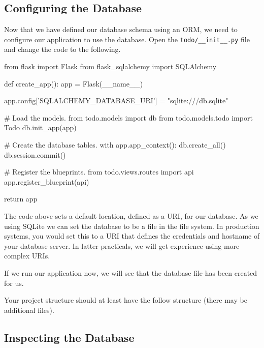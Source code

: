 \documentclass{csse4400}
\begin{document}
\subsection{Configuring the Database}

Now that we have defined our database schema using an ORM,
we need to configure our application to use the database.
Open the \texttt{todo/\_\_init\_\_.py} file and change the code to the following.

\begin{code}[language=python,numbers=none]{}
from flask import Flask
from flask_sqlalchemy import SQLAlchemy

def create_app():
    app = Flask(__name__)

    app.config['SQLALCHEMY_DATABASE_URI'] = "sqlite:///db.sqlite"

    # Load the models.
    from todo.models import db
    from todo.models.todo import Todo
    db.init_app(app)

    # Create the database tables.
    with app.app_context():
        db.create_all()
        db.session.commit()

    # Register the blueprints.
    from todo.views.routes import api
    app.register_blueprint(api)

    return app
\end{code}

The code above sets a default location, defined as a URI, for our database.
As we using SQLite we can set the database to be a file in the file system.
In production systems, you would set this to a URI that defines the credentials and hostname of your database server.
In latter practicals, we will get experience using more complex URIs.

If we run our application now, we will see that the database file has been created for us.

\pagebreak

Your project structure should at least have the follow structure (there may be additional files).



\subsection{Inspecting the Database}
\end{document}
